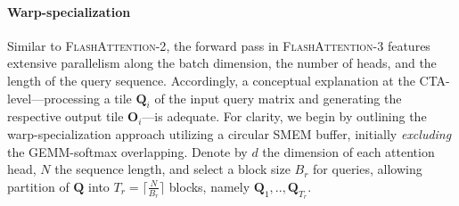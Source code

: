 \paragraph{Warp-specialization}
Similar to \textsc{FlashAttention-2}, the forward pass in \textsc{FlashAttention-3} features extensive parallelism along the batch dimension, the number of heads, and the length of the query sequence. Accordingly, a conceptual explanation at the CTA-level—processing a tile $\mathbf{Q}_i$ of the input query matrix and generating the respective output tile $\mathbf{O}_i$—is adequate. For clarity, we begin by outlining the warp-specialization approach utilizing a circular SMEM buffer, initially \emph{excluding} the GEMM-softmax overlapping. Denote by $d$ the dimension of each attention head, $N$ the sequence length, and select a block size $B_r$ for queries, allowing partition of $\mathbf{Q}$ into $T_r = \lceil \frac{N}{B_r} \rceil$ blocks, namely $\mathbf{Q}_1, .., \mathbf{Q}_{T_r}$.

